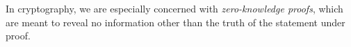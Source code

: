 In cryptography, we are especially concerned with \emph{zero-knowledge proofs},
which are meant to reveal no information other than the truth of the statement
under proof.


